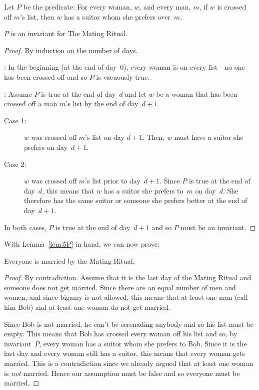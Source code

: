 \begin{definition}\label{def:P8}
Let $P$ be the predicate: For every woman, $w$, and every man, $m$, if
$w$ is crossed off $m$'s list, then $w$ has a suitor whom she prefers
over~$m$.
\end{definition}

\begin{lemma}\label{lem:5P}
$P$ is an invariant for The Mating Ritual.
\end{lemma}

\begin{proof}
By induction on the number of days.

: In the beginning (\ie at the end of day~0),
  every woman is on every list---no one has been crossed off and so
  $P$ is vacuously true.

: Assume $P$ is true at the end of
day~$d$ and let $w$ be a woman that has been crossed off a man $m$'s
list by the end of day~$d + 1$.

\begin{description}

\item[Case 1:]
$w$ was crossed off $m$'s list on day $d + 1$.  Then, $w$ must have a
  suitor she prefers on day~$d+1$.

\item[Case 2:]
$w$ was crossed off $m$'s list prior to day~$d+1$.  Since $P$ is true
  at the end of day~$d$, this means that $w$ has a suitor she prefers
  to~$m$ on day~$d$.  She therefore has the same suitor or someone she
  prefers better at the end of day~$d + 1$.

\end{description}
In both cases, $P$ is true at the end of day~$d + 1$ and so $P$ must
be an invariant.
\end{proof}

With Lemma~\ref{lem:5P} in hand, we can now prove:

\begin{theorem}
Everyone is married by the Mating Ritual.
\end{theorem}

\begin{proof}
By contradiction. Assume that it is the last day of the Mating Ritual
and someone does not get married.  Since there are an equal number of
men and women, and since bigamy is not allowed, this means that at
least one man (call him Bob) and at least one woman do not get
married.

Since Bob is not married, he can't be serenading anybody and so his
list must be empty.  This means that Bob has crossed every woman off
his list and so, by invariant~$P$, every woman has a suitor whom she
prefers to Bob.  Since it is the last day and every woman still has a
suitor, this means that every woman gets married.  This is a
contradiction since we already argued that at least one woman is
\emph{not} married.  Hence our assumption must be false and so
everyone must be married.
\end{proof}

